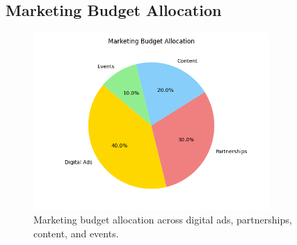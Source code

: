 \subsection{Marketing Budget Allocation}
\begin{figure}[h!]
    \centering
    \includegraphics[width=0.8\textwidth]{images/Market budget allogation.png}
    \caption{Marketing budget allocation across digital ads, partnerships, content, and events.}
    \label{fig:marketing_budget}
\end{figure}
